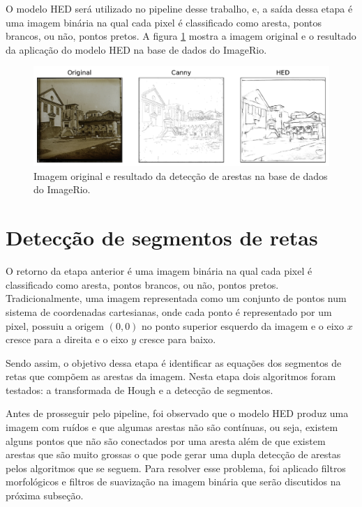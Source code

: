 \documentclass[12pt]{article}
\begin{document}
O modelo HED será utilizado no pipeline desse trabalho, e, a saída dessa etapa é uma imagem binária na qual cada pixel é classificado como aresta, pontos brancos, ou não, pontos pretos. A figura \ref{fig:bdarestas} mostra a imagem original e o resultado da aplicação do modelo HED na base de dados do ImageRio.

\begin{figure}
\centering
\includegraphics[scale=0.60]{exemple_edge.pdf}
\caption{Imagem original e resultado da detecção de arestas na base de dados do ImageRio.}
\label{fig:bdarestas}
\end{figure}

\section{Detecção de segmentos de retas}

O retorno da etapa anterior é uma imagem binária na qual cada pixel é classificado como aresta, pontos brancos, ou não, pontos pretos. Tradicionalmente, uma imagem representada como um conjunto de pontos num sistema de coordenadas cartesianas, onde cada ponto é representado por um pixel, possuiu a origem $(0,0)$ no ponto superior esquerdo da imagem e o eixo $x$ cresce para a direita e o eixo $y$ cresce para baixo. 

Sendo assim, o objetivo dessa etapa é identificar as equações dos segmentos de retas que compõem as arestas da imagem. Nesta etapa dois algoritmos foram testados: a transformada de Hough e a detecção de segmentos.

Antes de prosseguir pelo pipeline, foi observado que o modelo HED produz uma imagem com ruídos e que algumas arestas não são contínuas, ou seja, existem alguns pontos que não são conectados por uma aresta além de que existem arestas que são muito grossas o que pode gerar uma dupla detecção de arestas pelos algoritmos que se seguem. Para resolver esse problema, foi aplicado filtros morfológicos e filtros de suavização na imagem binária que serão discutidos na próxima subseção.
\end{document}
